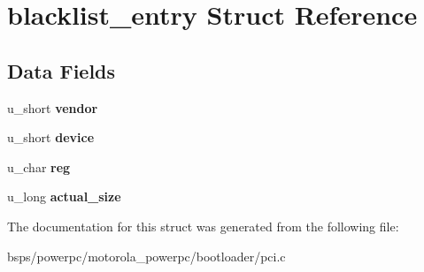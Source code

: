 \hypertarget{structblacklist__entry}{}\section{blacklist\+\_\+entry Struct Reference}
\label{structblacklist__entry}
\subsection*{Data Fields}
\begin{DoxyCompactItemize}
\item 
\mbox{\label{structblacklist__entry_a91c593dc0fbe325bc74711ddc5cdd988}} 
u\+\_\+short {\bfseries vendor}
\item 
\mbox{\label{structblacklist__entry_a3e4e136e300de387d75d963496c3742d}} 
u\+\_\+short {\bfseries device}
\item 
\mbox{\label{structblacklist__entry_a1dae65bf6f59c82df979a0c83233112f}} 
u\+\_\+char {\bfseries reg}
\item 
\mbox{\label{structblacklist__entry_a5c7d781bcb572b56f950f122b4f9b9c2}} 
u\+\_\+long {\bfseries actual\+\_\+size}
\end{DoxyCompactItemize}


The documentation for this struct was generated from the following file\+:\begin{DoxyCompactItemize}
\item 
bsps/powerpc/motorola\+\_\+powerpc/bootloader/pci.\+c\end{DoxyCompactItemize}
